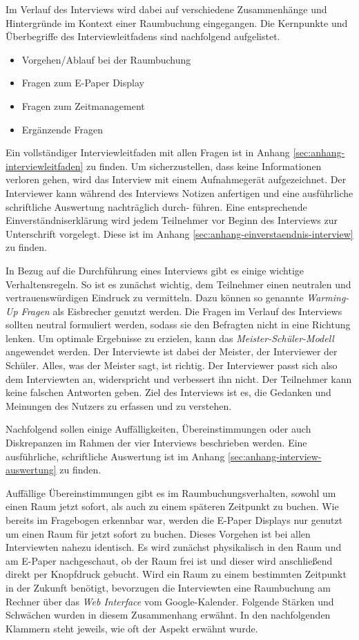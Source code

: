 Im Verlauf des Interviews wird dabei auf verschiedene Zusammenhänge und Hintergründe im Kontext einer Raumbuchung eingegangen. Die Kernpunkte und Überbegriffe des Interviewleitfadens sind nachfolgend aufgelistet. 

\begin{itemize}
    \item Vorgehen/Ablauf bei der Raumbuchung
    \item Fragen zum E-Paper Display 
    \item Fragen zum Zeitmanagement
    \item Ergänzende Fragen
\end{itemize}

Ein vollständiger Interviewleitfaden mit allen Fragen ist in Anhang \ref{sec:anhang-interviewleitfaden} zu finden. Um sicherzustellen, dass keine Informationen verloren gehen, wird das Interview mit einem Aufnahmegerät aufgezeichnet. Der Interviewer kann während des Interviews Notizen anfertigen und eine ausführliche schriftliche Auswertung nachträglich durch- führen. Eine entsprechende Einverständniserklärung wird jedem Teilnehmer vor Beginn des Interviews zur Unterschrift vorgelegt. Diese ist im Anhang \ref{sec:anhang-einverstaendnis-interview} zu finden. 

In Bezug auf die Durchführung eines Interviews gibt es einige wichtige Verhaltensregeln. So ist es zunächst wichtig, dem Teilnehmer einen neutralen und vertrauenswürdigen Eindruck zu vermitteln. Dazu können so genannte \textit{Warming-Up Fragen} als Eisbrecher genutzt werden. Die Fragen im Verlauf des Interviews sollten neutral formuliert werden, sodass sie den Befragten nicht in eine Richtung lenken. Um optimale Ergebnisse zu erzielen, kann das \textit{Meister-Schüler-Modell} angewendet werden. Der Interviewte ist dabei der Meister, der Interviewer der Schüler. Alles, was der Meister sagt, ist richtig. Der Interviewer passt sich also dem Interviewten an, widerspricht und verbessert ihn nicht. Der Teilnehmer kann keine falschen Antworten geben. Ziel des Interviews ist es, die Gedanken und Meinungen des Nutzers zu erfassen und zu \mbox{verstehen}. 

Nachfolgend sollen einige Auffälligkeiten, Übereinstimmungen oder auch Diskrepanzen im Rahmen der vier Interviews beschrieben werden. Eine ausführliche, schriftliche Auswertung ist im Anhang \ref{sec:anhang-interview-auswertung} zu finden. 

Auffällige Übereinstimmungen gibt es im Raumbuchungsverhalten, sowohl um einen Raum jetzt sofort, als auch zu einem späteren Zeitpunkt zu buchen. Wie bereits im Fragebogen erkennbar war, werden die E-Paper Displays nur genutzt um einen Raum für jetzt sofort zu buchen. Dieses Vorgehen ist bei allen Interviewten nahezu identisch. Es wird zunächst physikalisch in den Raum und am E-Paper nachgeschaut, ob der Raum frei ist und dieser wird anschließend direkt per Knopfdruck gebucht. Wird ein Raum zu einem bestimmten Zeitpunkt in der Zukunft benötigt, bevorzugen die Interviewten eine Raumbuchung am Rechner über das \textit{Web Interface} vom Google-Kalender. Folgende Stärken und Schwächen wurden in diesem Zusammenhang erwähnt. In den nachfolgenden Klammern steht jeweils, wie oft der Aspekt erwähnt wurde.

